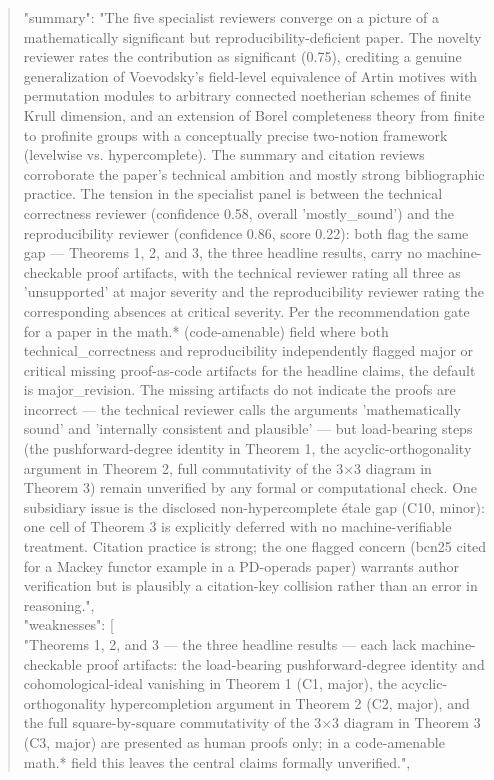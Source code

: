 \documentclass[11pt]{article}
\begin{document}
\begin{quote}
  "summary": "The five specialist reviewers converge on a picture of a mathematically significant but reproducibility-deficient paper. The novelty reviewer rates the contribution as significant (0.75), crediting a genuine generalization of Voevodsky's field-level equivalence of Artin motives with permutation modules to arbitrary connected noetherian schemes of finite Krull dimension, and an extension of Borel completeness theory from finite to profinite groups with a conceptually precise two-notion framework (levelwise vs. hypercomplete). The summary and citation reviews corroborate the paper's technical ambition and mostly strong bibliographic practice. The tension in the specialist panel is between the technical correctness reviewer (confidence 0.58, overall 'mostly\_sound') and the reproducibility reviewer (confidence 0.86, score 0.22): both flag the same gap --- Theorems 1, 2, and 3, the three headline results, carry no machine-checkable proof artifacts, with the technical reviewer rating all three as 'unsupported' at major severity and the reproducibility reviewer rating the corresponding absences at critical severity. Per the recommendation gate for a paper in the math.* (code-amenable) field where both technical\_correctness and reproducibility independently flagged major or critical missing proof-as-code artifacts for the headline claims, the default is major\_revision. The missing artifacts do not indicate the proofs are incorrect --- the technical reviewer calls the arguments 'mathematically sound' and 'internally consistent and plausible' --- but load-bearing steps (the pushforward-degree identity in Theorem 1, the acyclic-orthogonality argument in Theorem 2, full commutativity of the 3\ensuremath{\times}3 diagram in Theorem 3) remain unverified by any formal or computational check. One subsidiary issue is the disclosed non-hypercomplete étale gap (C10, minor): one cell of Theorem 3 is explicitly deferred with no machine-verifiable treatment. Citation practice is strong; the one flagged concern (bcn25 cited for a Mackey functor example in a PD-operads paper) warrants author verification but is plausibly a citation-key collision rather than an error in reasoning.",\\
  "weaknesses": [\\
    "Theorems 1, 2, and 3 --- the three headline results --- each lack machine-checkable proof artifacts: the load-bearing pushforward-degree identity and cohomological-ideal vanishing in Theorem 1 (C1, major), the acyclic-orthogonality hypercompletion argument in Theorem 2 (C2, major), and the full square-by-square commutativity of the 3\ensuremath{\times}3 diagram in Theorem 3 (C3, major) are presented as human proofs only; in a code-amenable math.* field this leaves the central claims formally unverified.",\\

\end{quote}
\end{document}

